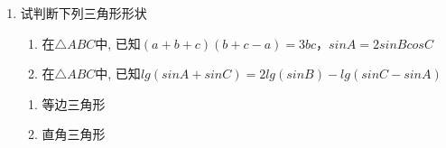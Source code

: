 \begin{enumerate}
    \item 试判断下列三角形形状
    \begin{enumerate}
        \item 在$\triangle{ABC}$中, 已知$(a+b+c)(b+c-a) = 3bc$，$sinA = 2sinBcosC$
        \item 在$\triangle{ABC}$中, 已知$lg(sinA + sinC) = 2lg(sinB) - lg(sinC - sinA)$
    \end{enumerate}
    \begin{jieda}
        \begin{enumerate}
            \item 等边三角形
            \item 直角三角形
        \end{enumerate}
    \end{jieda}


\end{enumerate}
